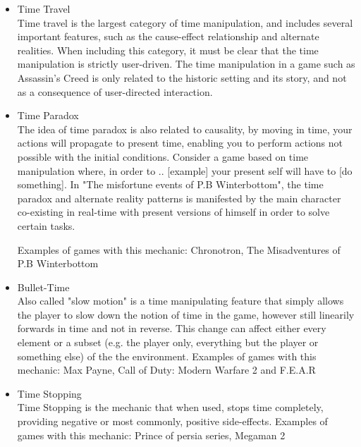 \begin{itemize}
\item{Time Travel} \\ Time travel is the largest category of time manipulation, and includes several important features, 
such as the cause-effect relationship and alternate realities. When including this category, it must be clear that the 
time manipulation is strictly user-driven. The time manipulation in a game such as Assassin's Creed is only related to the historic setting and its story, and not as a consequence of user-directed interaction. 

\item{Time Paradox} \\ The idea of time paradox is also related to causality, by moving in time, 
your actions will propagate to present time, enabling you to perform actions not possible with the initial conditions. 
Consider a game based on time manipulation where, in order to .. [example] 
your present self will have to [do something]. In "The misfortune events of P.B Winterbottom", the time paradox and alternate reality 
patterns is manifested by the main character co-existing in real-time with present versions of himself in order to solve certain tasks.

Examples of games with this mechanic: Chronotron, The Misadventures of P.B Winterbottom

\item{Bullet-Time} \\ Also called "slow motion" is a time manipulating feature that simply allows the player to slow 
down the notion of time in the game, however still linearily forwards in time and not in reverse. 
This change can affect either every element or a subset (e.g. the player only, everything but the player or something else) of the the environment. 
Examples of games with this mechanic: Max Payne, Call of Duty: Modern Warfare 2 and F.E.A.R

\item{Time Stopping} \\ Time Stopping is the mechanic that when used, stops time completely, providing negative or most commonly, positive side-effects. 
Examples of games with this mechanic: Prince of persia series, Megaman 2
\end{itemize}


